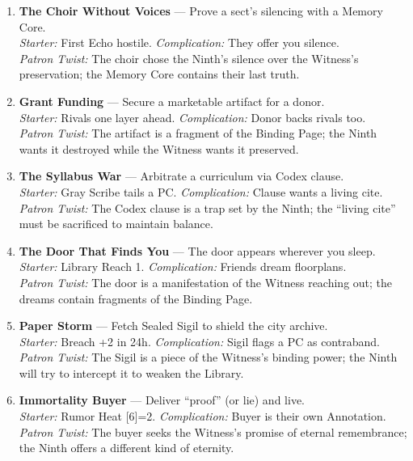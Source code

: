 \documentclass[10pt,letterpaper]{article}
\begin{document}
\begin{enumerate}[leftmargin=*]
\item \textbf{The Choir Without Voices} --- Prove a sect's silencing with a Memory Core.\\
\emph{Starter:} First Echo hostile. \emph{Complication:} They offer you silence. \\
\emph{Patron Twist:} The choir chose the Ninth's silence over the Witness's preservation; the Memory Core contains their last truth.

\item \textbf{Grant Funding} --- Secure a marketable artifact for a donor.\\
\emph{Starter:} Rivals one layer ahead. \emph{Complication:} Donor backs rivals too. \\
\emph{Patron Twist:} The artifact is a fragment of the Binding Page; the Ninth wants it destroyed while the Witness wants it preserved.

\item \textbf{The Syllabus War} --- Arbitrate a curriculum via Codex clause.\\
\emph{Starter:} Gray Scribe tails a PC. \emph{Complication:} Clause wants a living cite. \\
\emph{Patron Twist:} The Codex clause is a trap set by the Ninth; the ``living cite'' must be sacrificed to maintain balance.

\item \textbf{The Door That Finds You} --- The door appears wherever you sleep.\\
\emph{Starter:} Library Reach 1. \emph{Complication:} Friends dream floorplans. \\
\emph{Patron Twist:} The door is a manifestation of the Witness reaching out; the dreams contain fragments of the Binding Page.

\item \textbf{Paper Storm} --- Fetch Sealed Sigil to shield the city archive.\\
\emph{Starter:} Breach +2 in 24h. \emph{Complication:} Sigil flags a PC as contraband. \\
\emph{Patron Twist:} The Sigil is a piece of the Witness's binding power; the Ninth will try to intercept it to weaken the Library.

\item \textbf{Immortality Buyer} --- Deliver ``proof'' (or lie) and live.\\
\emph{Starter:} Rumor Heat [6]=2. \emph{Complication:} Buyer is their own Annotation. \\
\emph{Patron Twist:} The buyer seeks the Witness's promise of eternal remembrance; the Ninth offers a different kind of eternity.
\end{enumerate}
\end{document}
